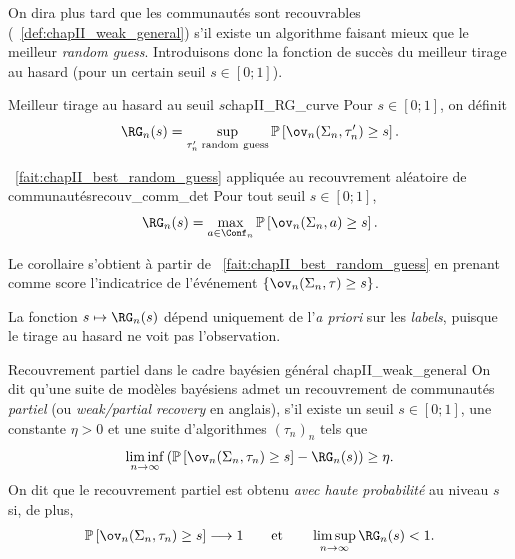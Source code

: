 On dira plus tard que les communautés sont recouvrables (\Def~\ref{def:chapII_weak_general}) s'il existe un algorithme faisant mieux que le meilleur \emph{random guess}. Introduisons donc la fonction de succès du meilleur tirage au hasard (pour un certain seuil $s \in [0 ; 1]$).

\begin{Definition}{Meilleur tirage au hasard au seuil $s$}{chapII_RG_curve}
Pour $s\in[0;1]$, on définit
\begin{equation}
    \RG_n(s)
    =
    \sup_{\tau_n'\;\mathrm{random\ guess}}
    \mathbb P\left[\ov_n(\Sigma_n,\tau_n')\ge s\right].
    \label{eq:chapII_RG_curve}
\end{equation}
\end{Definition}
\begin{Corollaire}{\Fact~\ref{fait:chapII_best_random_guess} appliquée au recouvrement aléatoire de communautés}{recouv_comm_det}
Pour tout seuil $s\in[0;1]$,
\begin{equation}
    \RG_n(s) = %
    \max_{a\in\Conf_n}
    \mathbb P\left[\ov_n(\Sigma_n,a)\ge s\right].
    \label{eq:chapII_best_guess_proba}
\end{equation}    

\end{Corollaire}
\begin{preuve}
Le corollaire s'obtient à partir de \Fact~\ref{fait:chapII_best_random_guess} en prenant comme score l'indicatrice de l'événement $\{\ov_n(\Sigma_n,\tau)\ge s\}$.
\end{preuve}

La fonction $s\mapsto\RG_n(s)$ dépend uniquement de l'\emph{a priori} sur les \emph{labels}, puisque le tirage au hasard ne voit pas l'observation.

\begin{Definition}{Recouvrement partiel dans le cadre bayésien général \cite{SankararamanBaccelli2018}}{chapII_weak_general}
On dit qu'une suite de modèles bayésiens admet un recouvrement de communautés \emph{partiel} (ou \emph{weak/partial recovery} en anglais), s'il existe un seuil $s\in[0;1]$, une constante $\eta>0$ et une suite d'algorithmes $(\tau_n)_n$ tels que
\begin{equation}
    \liminf_{n\to\infty}
    \left(
        \mathbb P\left[\ov_n(\Sigma_n,\tau_n)\ge s\right]
        -
        \RG_n(s)
    \right)
    \ge \eta.
    \label{eq:chapII_weak_general_probability}
\end{equation}
On dit que le recouvrement partiel est obtenu \emph{avec haute probabilité} au niveau $s$ si, de plus,
\begin{equation}
    \mathbb P\left[\ov_n(\Sigma_n,\tau_n)\ge s\right]\longrightarrow1
    \qquad\text{et}\qquad
    \limsup_{n\to\infty}\RG_n(s)<1.
    \label{eq:chapII_weak_general_high_probability}
\end{equation}
\end{Definition}

